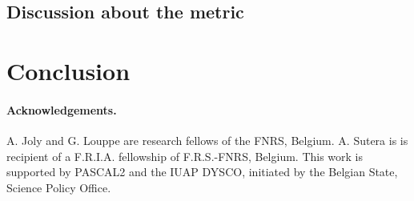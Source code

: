 \documentclass[wcp]{jmlr}
\begin{document}
\subsection{Discussion about the metric}
\label{sec:metric}


\section{Conclusion}





\begin{scriptsize}

\paragraph{Acknowledgements.} A. Joly and G. Louppe are research fellows of
the FNRS, Belgium.  A. Sutera is  is recipient of
a F.R.I.A. fellowship of F.R.S.-FNRS, Belgium.
This work is supported by PASCAL2 and the IUAP DYSCO, initiated by the
Belgian State, Science Policy Office.

\end{scriptsize}

\newpage
\clearpage


\end{document}
